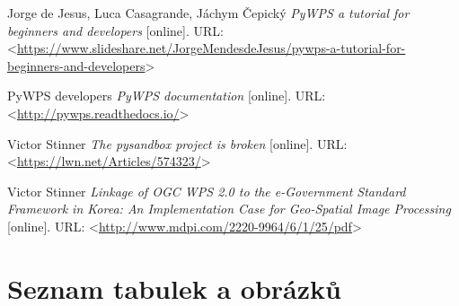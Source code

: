 \documentclass[12pt,a4paper]{article}
\begin{document}
\begin{thebibliography}{99}
Jorge de Jesus, Luca Casagrande, Jáchym Čepický \textit{PyWPS a tutorial for beginners and developers} [online].
URL: \textless\url{https://www.slideshare.net/JorgeMendesdeJesus/pywps-a-tutorial-for-beginners-and-developers}\textgreater

PyWPS developers \textit{PyWPS documentation} [online].
URL: \textless\url{http://pywps.readthedocs.io/}\textgreater

Victor Stinner \textit{The pysandbox project is broken} [online].
URL: \textless\url{https://lwn.net/Articles/574323/}\textgreater

Victor Stinner \textit{Linkage of OGC WPS 2.0 to the e-Government Standard Framework in Korea: An Implementation Case for Geo-Spatial Image Processing} [online].
URL: \textless\url{http://www.mdpi.com/2220-9964/6/1/25/pdf}\textgreater

\end{thebibliography}

\newpage
\section{Seznam tabulek a obrázků}
\listoftables

\listoffigures
\end{document}
